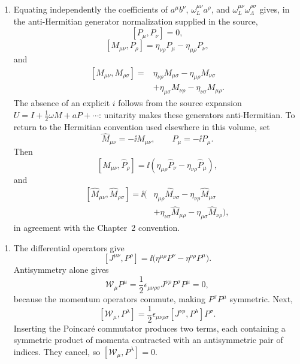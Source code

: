 \begin{enumerate}
\begin{enumerate}
\item[(viii)] Equating independently the coefficients of
\(a^\mu b^\nu\), \(\omega_L^{\mu\nu}a^\rho\), and
\(\omega_L^{\mu\nu}\omega_\Lambda^{\rho\sigma}\) gives, in the
anti-Hermitian generator normalization supplied in the source,
\[
 [P_\mu,P_\nu]=0,
\]
\[
 [M_{\mu\nu},P_\rho]
 =\eta_{\nu\rho}P_\mu-\eta_{\mu\rho}P_\nu,
\]
and
\[
\begin{split}
 [M_{\mu\nu},M_{\rho\sigma}]
 ={}&\eta_{\nu\rho}M_{\mu\sigma}
    -\eta_{\mu\rho}M_{\nu\sigma}\\
   &+\eta_{\mu\sigma}M_{\nu\rho}
    -\eta_{\nu\sigma}M_{\mu\rho}.
\end{split}
\]
The absence of an explicit \(i\) follows from the source expansion
\(U=I+\frac12\omega M+aP+\cdots\): unitarity makes these generators
anti-Hermitian.  To return to the Hermitian convention used elsewhere in
this volume, set
\[
 \widehat M_{\mu\nu}=-\ii M_{\mu\nu},\qquad
 \widehat P_\mu=-\ii P_\mu.
\]
Then
\[
 [\widehat M_{\mu\nu},\widehat P_\rho]
 =\ii(\eta_{\mu\rho}\widehat P_\nu
    -\eta_{\nu\rho}\widehat P_\mu),
\]
and
\[
\begin{split}
 [\widehat M_{\mu\nu},\widehat M_{\rho\sigma}]
 =\ii(&\eta_{\mu\rho}\widehat M_{\nu\sigma}
    -\eta_{\nu\rho}\widehat M_{\mu\sigma}\\
   &+\eta_{\nu\sigma}\widehat M_{\mu\rho}
    -\eta_{\mu\sigma}\widehat M_{\nu\rho}),
\end{split}
\]
in agreement with the Chapter~2 convention.
\end{enumerate}

\begin{enumerate}
\item
The differential operators give
\[
 [J^{\mu\nu},P^\rho]
 =\ii\bigl(\eta^{\mu\rho}P^\nu-\eta^{\nu\rho}P^\mu\bigr).
\]
Antisymmetry alone gives
\[
 \mathcal W_\mu P^\mu
 =\frac12\epsilon_{\mu\nu\rho\sigma}
 J^{\nu\rho}P^\sigma P^\mu=0,
\]
because the momentum operators commute, making
\(P^\sigma P^\mu\) symmetric.  Next,
\[
 [\mathcal W_\mu,P^\lambda]
 =\frac12\epsilon_{\mu\nu\rho\sigma}
 [J^{\nu\rho},P^\lambda]P^\sigma.
\]
Inserting the Poincar\'e commutator produces two terms, each containing a
symmetric product of momenta contracted with an antisymmetric pair of
indices.  They cancel, so
\([\mathcal W_\mu,P^\lambda]=0\).


\end{enumerate}
\end{enumerate}

